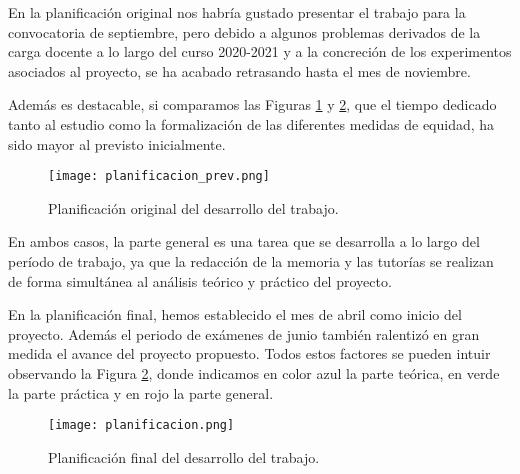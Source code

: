 En la planificación original nos habría gustado presentar el trabajo para la convocatoria de septiembre, pero debido a algunos problemas derivados de la carga docente a lo largo del curso 2020-2021 y a la concreción de los experimentos asociados al proyecto, se ha acabado retrasando hasta el mes de noviembre.

Además es destacable, si comparamos las Figuras \ref{fig:planning_prev} y \ref{fig:planning}, que el tiempo dedicado tanto al estudio como la formalización de las diferentes medidas de equidad, ha sido mayor al previsto inicialmente.\\

\begin{figure}[h]
	\centering
	\texttt{[image: planificacion\_prev.png]}
	\caption{Planificación original del desarrollo del trabajo.}
    \label{fig:planning_prev}
\end{figure}

\clearpage

En ambos casos, la parte general es una tarea que se desarrolla a lo largo del período de trabajo, ya que la redacción de la memoria y las tutorías se realizan de forma simultánea al análisis teórico y práctico del proyecto. 

En la planificación final, hemos establecido el mes de abril como inicio del proyecto. Además el periodo de exámenes de junio también ralentizó en gran medida el avance del proyecto propuesto. Todos estos factores se pueden intuir observando la Figura \ref{fig:planning}, donde indicamos en color azul la parte teórica, en verde la parte práctica y en rojo la parte general.\\

\begin{figure}[h]
	\centering
	\texttt{[image: planificacion.png]}
	\caption{Planificación final del desarrollo del trabajo.}
    \label{fig:planning}
\end{figure}

